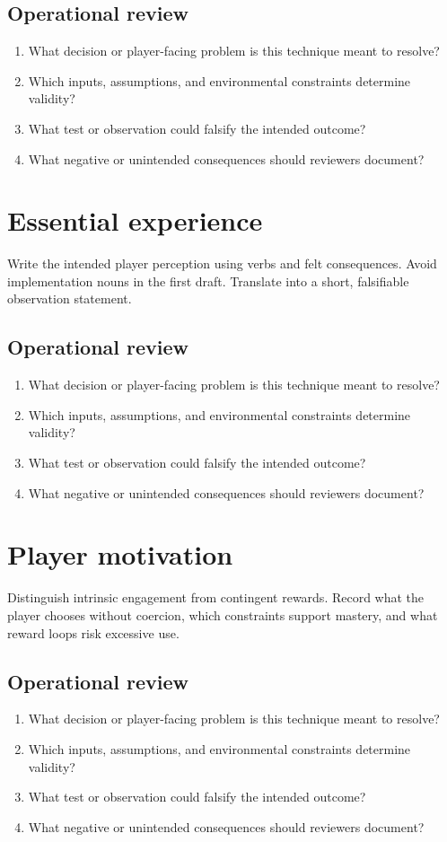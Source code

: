 \documentclass[11pt]{article}
\begin{document}
\subsection{Operational review}
\begin{enumerate}
\item What decision or player-facing problem is this technique meant to resolve?
\item Which inputs, assumptions, and environmental constraints determine validity?
\item What test or observation could falsify the intended outcome?
\item What negative or unintended consequences should reviewers document?
\end{enumerate}

\section{Essential experience}
Write the intended player perception using verbs and felt consequences. Avoid implementation nouns in the first draft. Translate into a short, falsifiable observation statement.


\subsection{Operational review}
\begin{enumerate}
\item What decision or player-facing problem is this technique meant to resolve?
\item Which inputs, assumptions, and environmental constraints determine validity?
\item What test or observation could falsify the intended outcome?
\item What negative or unintended consequences should reviewers document?
\end{enumerate}

\section{Player motivation}
Distinguish intrinsic engagement from contingent rewards. Record what the player chooses without coercion, which constraints support mastery, and what reward loops risk excessive use.


\subsection{Operational review}
\begin{enumerate}
\item What decision or player-facing problem is this technique meant to resolve?
\item Which inputs, assumptions, and environmental constraints determine validity?
\item What test or observation could falsify the intended outcome?
\item What negative or unintended consequences should reviewers document?
\end{enumerate}
\end{document}
